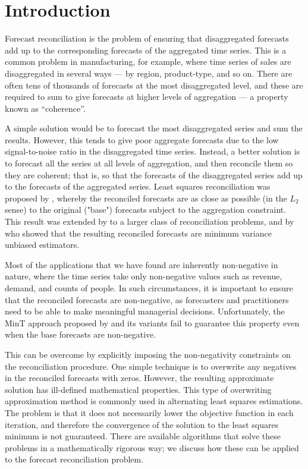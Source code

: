 \documentclass[11pt]{article}
\newcommand{\0}{\phantom{0}}
\begin{document}
\newpage

\section{Introduction}

Forecast reconciliation is the problem of ensuring that disaggregated forecasts add up to the corresponding forecasts of the aggregated time series. This is a common problem in manufacturing, for example, where time series of sales are disaggregated in several ways --- by region, product-type, and so on. There are often tens of thousands of forecasts at the most disaggregated level, and these are required to sum to give forecasts at higher levels of aggregation --- a property known as ``coherence''.

A simple solution would be to forecast the most disaggregated series and sum the results. However, this tends to give poor aggregate forecasts due to the low signal-to-noise ratio in the disaggregated time series. Instead, a better solution is to forecast all the series at all levels of aggregation, and then reconcile them so they are coherent; that is, so that the forecasts of the disaggregated series add up to the forecasts of the aggregated series. Least squares reconciliation was proposed by \citet{Hyndman2011}, whereby the reconciled forecasts are as close as possible (in the $L_2$ sense) to the original ("base") forecasts subject to the aggregation constraint. This result was extended by \citet{Hyndman2016} to a larger class of reconciliation problems, and by \citet{Wick2018} who showed that the resulting reconciled forecasts are minimum variance unbiased estimators.

Most of the applications that we have found are inherently non-negative in nature, where the time series take only non-negative values such as revenue, demand, and counts of people. In such circumstances, it is important to ensure that the reconciled forecasts are non-negative, as forecasters and practitioners need to be able to make meaningful managerial decisions. Unfortunately, the MinT approach proposed by \citet{Wick2018} and its variants fail to guarantee this property even when the base forecasts are non-negative.

This can be overcome by explicitly imposing the non-negativity constraints on the reconciliation procedure. One simple technique is to overwrite any negatives in the reconciled forecasts with zeros. However, the resulting approximate solution has ill-defined mathematical properties. This type of overwriting approximation method is commonly used in alternating least squares estimations. The problem is that it does not necessarily lower the objective function in each iteration, and therefore the convergence of the solution to the least squares minimum is not guaranteed. There are available algorithms that solve these problems in a mathematically rigorous way; we discuss how these can be applied to the forecast reconciliation problem.
\end{document}
